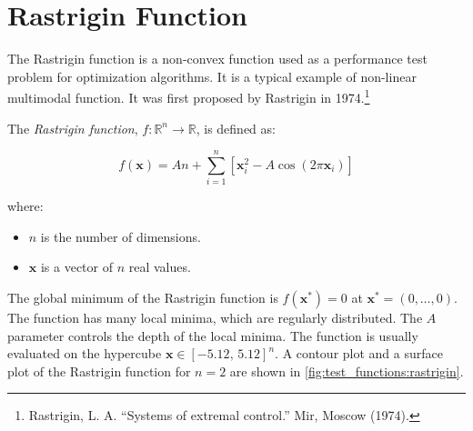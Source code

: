 \section{Rastrigin Function}
\label{sec:test_functions:rastrigin}
  The Rastrigin function is a non-convex function used as a performance test problem for 
  optimization algorithms.
  It is a typical example of non-linear multimodal function.
  It was first proposed by Rastrigin in 1974.\footnote{
    Rastrigin, L. A. \enquote{Systems of extremal control.} Mir, Moscow (1974).
  }

  \begin{definition}
    \label{def:test_functions:rastrigin}
    The \emph{Rastrigin function}, \(f: \mathbb{R}^n \rightarrow \mathbb{R}\), is defined as:

    \begin{equation}
      \label{eq:test_functions:rastrigin}
      f(\mathbf{x}) = An + \sum_{i=1}^{n} \left[ \mathbf{x}_i^2 - A\cos(2\pi \mathbf{x}_i) \right]
    \end{equation}
      
    where:

    \begin{itemize}
      \item \(n\) is the number of dimensions.
      \item \(\mathbf{x}\) is a vector of \(n\) real values.
    \end{itemize}
  \end{definition}

  The global minimum of the Rastrigin function is \(f(\mathbf{x}^*) = 0\) at \(\mathbf{x}^* = 
  (0, \ldots, 0)\).
  The function has many local minima, which are regularly distributed.
  The \(A\) parameter controls the depth of the local minima.
  The function is usually evaluated on the hypercube \(\mathbf{x} \in 
  [-5.12,\, 5.12]^n\).
  A contour plot and a surface plot of the Rastrigin function for \(n = 2\) are shown in
  \vref{fig:test_functions:rastrigin}.


